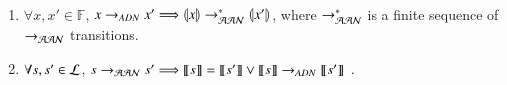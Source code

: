 \begin{theorem}[$\DNdef \approx \toPH\DNdef$]~
\label{th:bisimDN}
  \begin{enumerate}
    \item \label{adn2ph} $\forall x,x'\in\mathbb F$,
      $x\rightarrow_{ADN} x' \Longrightarrow \llparenthesis x\rrparenthesis \rightarrow_{\mathcal{AAN}}^* \llparenthesis x'\rrparenthesis$,
      where $\rightarrow_{\mathcal{AAN}}^*$ is a finite sequence of $\rightarrow_{\mathcal{AAN}}$ transitions.

    \item \label{ph2adn} $\forall s,s'\in \mathcal{L}$,
      $s\rightarrow_{\mathcal{AAN}} s' \Longrightarrow \llbracket s\rrbracket = \llbracket s'\rrbracket \vee \llbracket s\rrbracket \rightarrow_{ADN}
      \llbracket s'\rrbracket\enspace.$
  \end{enumerate}
\end{theorem}
